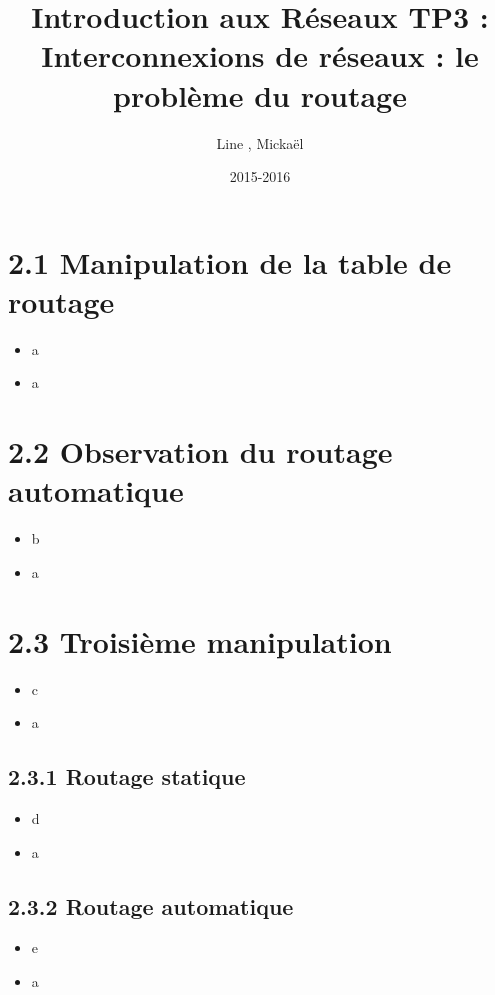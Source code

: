 \documentclass{article}
\title{Introduction aux Réseaux TP3 : \\ Interconnexions de réseaux : le problème du routage}
\author{Line \bsc{POUVARET}, Mickaël \bsc{TURNEL}}
\date{2015-2016}
\begin{document}
\maketitle

\section*{2.1 Manipulation de la table de routage}

\begin{itemize}\renewcommand{\labelitemi}{$\bullet$}
\item a
\item a
\end{itemize}


\section*{2.2 Observation du routage automatique}

\begin{itemize}\renewcommand{\labelitemi}{$\bullet$}
\item b
\item a
\end{itemize}


\section*{2.3 Troisième manipulation}

\begin{itemize}\renewcommand{\labelitemi}{$\bullet$}
\item c
\item a
\end{itemize}


\subsection*{2.3.1 Routage statique}

\begin{itemize}\renewcommand{\labelitemi}{$\bullet$}
\item d
\item a
\end{itemize}


\subsection*{2.3.2 Routage automatique}

\begin{itemize}\renewcommand{\labelitemi}{$\bullet$}
\item e
\item a
\end{itemize}
\end{document}
